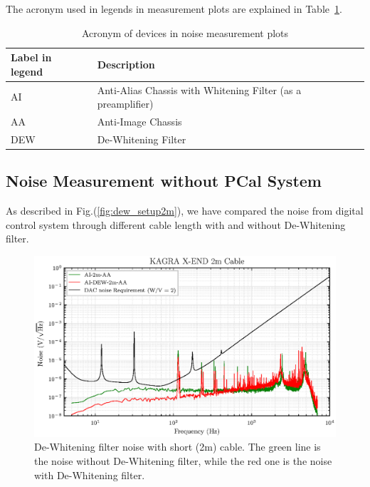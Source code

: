 \pagebreak

The acronym used in legends in measurement plots are explained in Table~\ref{tab:acronym_legend}. \\


\begin{table}[hbt!]
\centering
\begin{tabular}{ll}
\hline
Label in legend  & Description        \\
\hline
AI      & Anti-Alias  Chassis with Whitening Filter (as a preamplifier) \\
AA      & Anti-Image  Chassis   \\
DEW     & De-Whitening Filter   \\
\hline
\end{tabular}
\caption{Acronym of devices in noise measurement plots}
\label{tab:acronym_legend}
\end{table}



\pagebreak
\subsection{Noise Measurement without PCal System}

As described in Fig.(\ref{fig:dew_setup2m}), we have compared the noise from digital control system through different cable length with and without De-Whitening filter.

\begin{figure}[hbt!]
\centering
\includegraphics[width=1\textwidth]{figure/noise/00_2m}
\caption[De-Whitening filter noise with short cable]{ De-Whitening filter noise with short (2m) cable. The green line is the noise without De-Whitening filter, while the red one is the noise with De-Whitening filter.   }
\label{fig:00_2m}
\end{figure}

